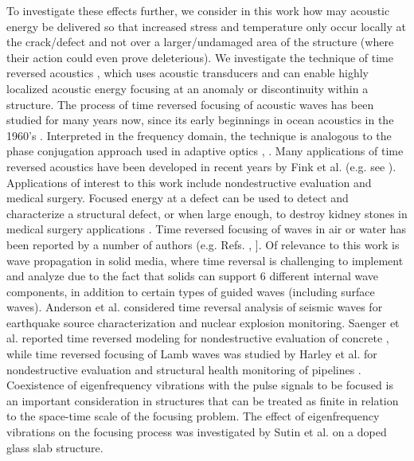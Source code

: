 \documentclass[11pt,letterpaper]{article}%
\begin{document}
To investigate these effects further, we consider in
this work how may acoustic energy be delivered so that increased stress and
temperature only occur locally at the crack/defect and not over a
larger/undamaged area of the structure (where their action could
even prove deleterious).  We investigate the technique of time reversed acoustics \cite{fink},
which uses acoustic transducers and can enable highly localized
acoustic energy focusing at an anomaly or discontinuity within a
structure. The process of time reversed focusing of acoustic waves has been
studied for many years now, since its early beginnings in ocean
acoustics in the 1960's \cite{parvulescu}. Interpreted in the
frequency domain, the technique is analogous to the phase
conjugation approach used in adaptive optics \cite{fink},
\cite{anderson}. Many applications of time reversed acoustics
have been developed in recent years by Fink et al. (e.g. see
\cite{fink}). Applications of interest to this work include
nondestructive evaluation and medical surgery. Focused energy at
a defect can be used to detect and characterize a structural
defect, or when large enough, to destroy kidney stones in medical
surgery applications \cite{fink}. Time reversed focusing of waves
in air or water has been reported by a number of authors (e.g.
Refs. \cite{fink}, \cite{thomas}]. Of relevance to this work is
wave propagation in solid media, where time reversal is
challenging to implement and analyze due to the fact that solids
can support 6 different internal wave components, in addition to
certain types of guided waves (including surface waves). Anderson
et al. \cite{anderson} considered time reversal analysis of
seismic waves for earthquake source characterization and nuclear
explosion monitoring. Saenger et al. reported time reversed
modeling for nondestructive evaluation of concrete
\cite{saenger}, while time reversed focusing of Lamb waves was
studied by Harley et al. for nondestructive evaluation and
structural health monitoring of pipelines \cite{harley}.
Coexistence of eigenfrequency vibrations with the pulse signals to
be focused is an important consideration in structures that can be
treated as finite in relation to the space-time scale of the
focusing problem. The effect of eigenfrequency vibrations on the
focusing process was investigated by Sutin et al. \cite{sutin} on
a doped glass slab structure.
\end{document}
